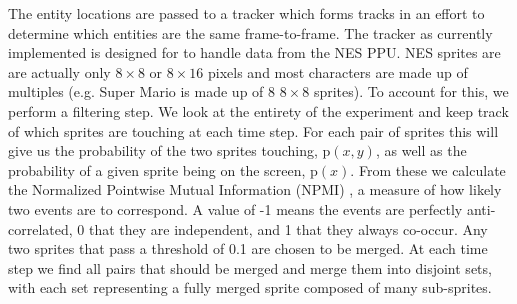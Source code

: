 \documentclass[a4paper]{article}
\begin{document}
The entity locations are passed to a tracker which forms tracks in an effort to determine which entities are the same frame-to-frame.  The tracker as currently implemented is designed for to handle data from the NES PPU.  NES sprites are are actually only $8\times8$ or $8\times16$ pixels and most characters are made up of multiples (e.g. Super Mario is made up of $8$ $8\times8$ sprites).
To account for this, we perform a filtering step.  We look at the entirety of the experiment and keep track of which sprites are touching at each time step.  For each pair of sprites this will give us the probability of the two sprites touching, $\mathrm{p}(x,y)$, as well as the probability of a given sprite being on the screen, $\mathrm{p}(x)$.  From these we calculate the Normalized Pointwise Mutual Information (NPMI) \cite{summerville2017what}, a measure of how likely two events are to correspond.
A value of -1 means the events are perfectly anti-correlated, 0 that they are independent, and 1 that they always co-occur.  Any two sprites that pass a threshold of 0.1 are chosen to be merged.
At each time step we find all pairs that should be merged and merge them into disjoint sets, with each set representing a fully merged sprite composed of many sub-sprites.
\end{document}
